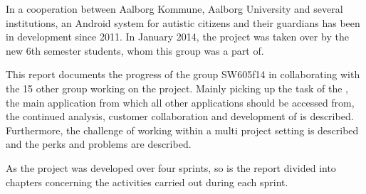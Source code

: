 In a cooperation between Aalborg Kommune, Aalborg University and several institutions, an Android system for autistic citizens and their guardians has been in development since 2011.
In January 2014, the project was taken over by the new 6th semester students, whom this group was a part of.

This report documents the progress of the group SW605f14 in collaborating with the 15 other group working on the project.
Mainly picking up the task of the \launcher, the main application from which all other applications should be accessed from, the continued analysis, customer collaboration and development of is described.
Furthermore, the challenge of working within a multi project setting is described and the perks and problems are described.

As the project was developed over four sprints, so is the report divided into chapters concerning the activities carried out during each sprint.